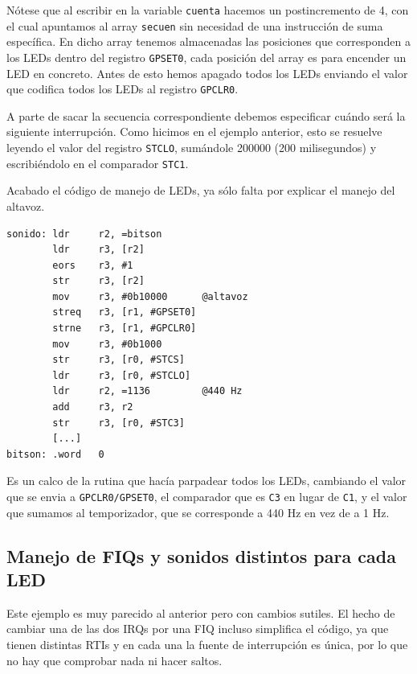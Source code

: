 Nótese que al escribir en la variable {\tt cuenta} hacemos un postincremento de 4, con el
cual apuntamos al array {\tt secuen} sin necesidad de una instrucción de suma específica.
En dicho array tenemos almacenadas las posiciones que corresponden a los LEDs dentro del
registro {\tt GPSET0}, cada posición del array es para encender un LED en concreto. Antes
de esto hemos apagado todos los LEDs enviando el valor que codifica todos los LEDs al
registro {\tt GPCLR0}.

A parte de sacar la secuencia correspondiente debemos especificar cuándo será la siguiente
interrupción. Como hicimos en el ejemplo anterior, esto se resuelve leyendo el valor del
registro {\tt STCLO}, sumándole 200000 (200 milisegundos) y escribiéndolo en el comparador
{\tt STC1}.

Acabado el código de manejo de LEDs, ya sólo falta por explicar el manejo del altavoz.

\begin{lstlisting}
sonido: ldr     r2, =bitson
        ldr     r3, [r2]
        eors    r3, #1
        str     r3, [r2]
        mov     r3, #0b10000      @altavoz
        streq   r3, [r1, #GPSET0]
        strne   r3, [r1, #GPCLR0]
        mov     r3, #0b1000
        str     r3, [r0, #STCS]
        ldr     r3, [r0, #STCLO]
        ldr     r2, =1136         @440 Hz
        add     r3, r2
        str     r3, [r0, #STC3]
        [...]
bitson: .word   0
\end{lstlisting}

Es un calco de la rutina que hacía parpadear todos los LEDs, cambiando
el valor que se envia a {\tt GPCLR0/GPSET0}, el comparador que es {\tt C3} en lugar de {\tt C1},
y el valor que sumamos al temporizador, que se corresponde a 440 Hz en vez de a 1 Hz.

\subsection{Manejo de FIQs y sonidos distintos para cada LED}

Este ejemplo es muy parecido al anterior pero con cambios sutiles. El hecho de cambiar una de
las dos IRQs por una FIQ incluso simplifica el código, ya que tienen distintas RTIs y en cada
una la fuente de interrupción es única, por lo que no hay que comprobar nada ni hacer saltos.


